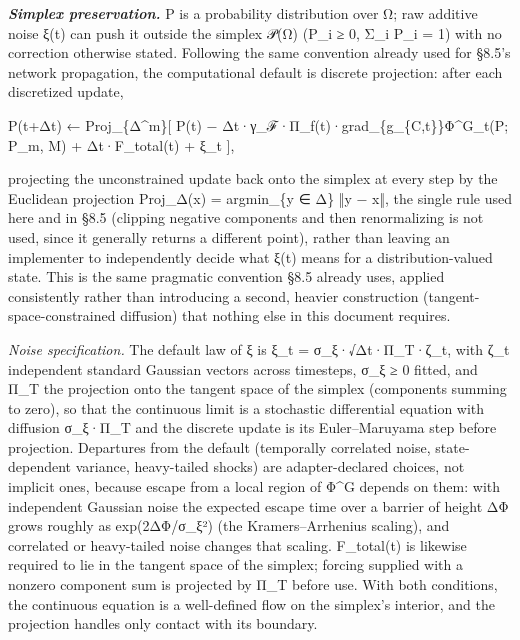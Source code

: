 \documentclass[
]{article}
\begin{document}
\emph{\textbf{Simplex preservation.}} P is a probability distribution
over Ω; raw additive noise ξ(t) can push it outside the simplex 𝒫(Ω)
(P\_i ≥ 0, Σ\_i P\_i = 1) with no correction otherwise stated. Following
the same convention already used for §8.5's network propagation, the
computational default is discrete projection: after each discretized
update,

P(t+Δt) ← Proj\_\{Δ\^{}m\}{[} P(t) −
Δt·γ\_ℱ·Π\_f(t)·grad\_\{g\_\{C,t\}\}Φ\^{}G\_t(P; P\_m, M) +
Δt·F\_total(t) + ξ\_t {]},

projecting the unconstrained update back onto the simplex at every step
by the Euclidean projection Proj\_Δ(x) = argmin\_\{y ∈ Δ\} ‖y − x‖, the
single rule used here and in §8.5 (clipping negative components and then
renormalizing is not used, since it generally returns a different
point), rather than leaving an implementer to independently decide what
ξ(t) means for a distribution-valued state. This is the same pragmatic
convention §8.5 already uses, applied consistently rather than
introducing a second, heavier construction (tangent-space-constrained
diffusion) that nothing else in this document requires.

\emph{Noise specification.} The default law of ξ is ξ\_t =
σ\_ξ·√Δt·Π\_T·ζ\_t, with ζ\_t independent standard Gaussian vectors
across timesteps, σ\_ξ ≥ 0 fitted, and Π\_T the projection onto the
tangent space of the simplex (components summing to zero), so that the
continuous limit is a stochastic differential equation with diffusion
σ\_ξ·Π\_T and the discrete update is its Euler--Maruyama step before
projection. Departures from the default (temporally correlated noise,
state-dependent variance, heavy-tailed shocks) are adapter-declared
choices, not implicit ones, because escape from a local region of Φ\^{}G
depends on them: with independent Gaussian noise the expected escape
time over a barrier of height ΔΦ grows roughly as exp(2ΔΦ/σ\_ξ²) (the
Kramers--Arrhenius scaling), and correlated or heavy-tailed noise
changes that scaling. F\_total(t) is likewise required to lie in the
tangent space of the simplex; forcing supplied with a nonzero component
sum is projected by Π\_T before use. With both conditions, the
continuous equation is a well-defined flow on the simplex's interior,
and the projection handles only contact with its boundary.
\end{document}
